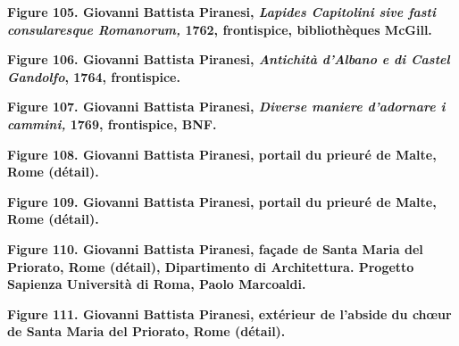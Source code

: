 \documentclass[12pt,twoside,openany]{book}
\begin{document}
\begin{center}
\par\small \textbf{Figure 105. Giovanni Battista Piranesi, \textit{Lapides Capitolini sive fasti consularesque Romanorum, }1762, frontispice, bibliothèques McGill.}
\end{center}

\begin{center}
\par\small \textbf{Figure 106. Giovanni Battista Piranesi, \textit{Antichità d’Albano e di Castel Gandolfo}, 1764, frontispice.}
\end{center}

\begin{center}
\par\small \textbf{Figure 107. Giovanni Battista Piranesi, \textit{Diverse maniere d’adornare i cammini,} 1769, frontispice, BNF.}
\end{center}

\begin{center}
\par\small \textbf{Figure 108. Giovanni Battista Piranesi, portail du prieuré de Malte, Rome (détail).}
\end{center}

\begin{center}
\par\small \textbf{Figure 109. Giovanni Battista Piranesi, portail du prieuré de Malte, Rome (détail).}
\end{center}

\begin{center}
\par\small \textbf{Figure 110. Giovanni Battista Piranesi, façade de Santa Maria del Priorato, Rome (détail), Dipartimento di Architettura. Progetto Sapienza Università di Roma, Paolo Marcoaldi.}
\end{center}

\begin{center}
\par\small \textbf{Figure 111. Giovanni Battista Piranesi, extérieur de l’abside du chœur de Santa Maria del Priorato, Rome (détail).}
\end{center}
\end{document}
